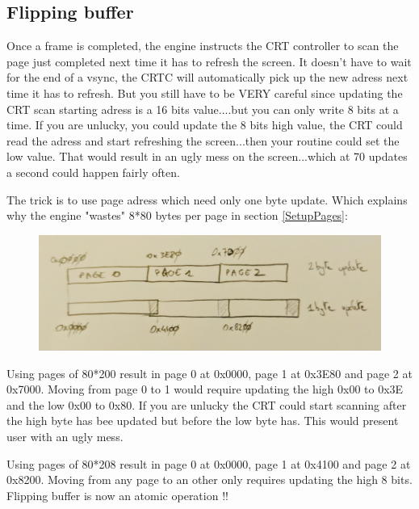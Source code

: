 \subsection{Flipping buffer} \label{Flippingbuffer}
Once a frame is completed, the engine instructs the CRT controller to scan the page just completed next time it has to refresh the screen. It doesn't have to wait for the end of a vsync, the CRTC will automatically pick up the new adress next time it has to refresh. But you still have to be VERY careful since updating the CRT scan starting adress is a 16 bits value....but you can only write 8 bits at a time. If you are unlucky, you could update the 8 bits high value, the CRT could read the adress and start refreshing the screen...then your routine could set the low value. That would result in an ugly mess on the screen...which at 70 updates a second could happen fairly often.\\
\par
The trick is to use page adress which need only one byte update. Which explains why the engine "wastes" 8*80 bytes per page in section \ref{SetupPages}:\\
\par
\begin{figure}[H]
 \centering
 \includegraphics[width=\textwidth]{imgs/triple_pages_trick.png}
\end{figure}
\par
Using pages of 80*200 result in page 0 at 0x0000, page 1 at 0x3E80 and page 2 at 0x7000. Moving from page 0 to 1 would require updating the high 0x00 to 0x3E and the low 0x00 to 0x80. If you are unlucky the CRT could start scanning after the high byte has bee updated but before the low byte has. This would present user with an ugly mess.\\
\par
Using pages of 80*208 result in page 0 at 0x0000, page 1 at 0x4100 and page 2 at 0x8200. Moving from any page to an other only requires updating the high 8 bits. Flipping buffer is now an atomic operation !!\\





